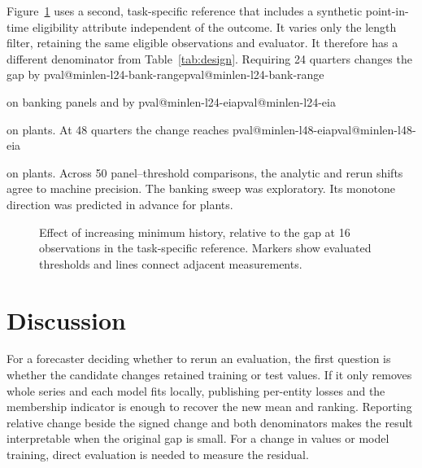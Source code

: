 \documentclass[linenumber]{jdsart}
\makeatletter
\newcommand{\val}[1]{\ifcsname pval@#1\endcsname\csname pval@#1\endcsname\else\PackageError{paper}{Missing value #1}{}\fi}
\makeatother
\begin{document}
Figure~\ref{fig:length} uses a second, task-specific reference that includes a synthetic point-in-time eligibility attribute independent of the outcome. It varies only the length filter, retaining the same eligible observations and evaluator. It therefore has a different denominator from Table~\ref{tab:design}. Requiring 24 quarters changes the gap by \val{minlen-l24-bank-range} on banking panels and by \val{minlen-l24-eia} on plants. At 48 quarters the change reaches \val{minlen-l48-eia} on plants. Across 50 panel--threshold comparisons, the analytic and rerun shifts agree to machine precision. The banking sweep was exploratory. Its monotone direction was predicted in advance for plants.
\begin{figure}[t]
\centering
{}
\caption{Effect of increasing minimum history, relative to the gap at 16 observations in the task-specific reference. Markers show evaluated thresholds and lines connect adjacent measurements.}\label{fig:length}
\end{figure}

\section{Discussion}
For a forecaster deciding whether to rerun an evaluation, the first question is whether the candidate changes retained training or test values. If it only removes whole series and each model fits locally, publishing per-entity losses and the membership indicator is enough to recover the new mean and ranking. Reporting relative change beside the signed change and both denominators makes the result interpretable when the original gap is small. For a change in values or model training, direct evaluation is needed to measure the residual.
\end{document}

